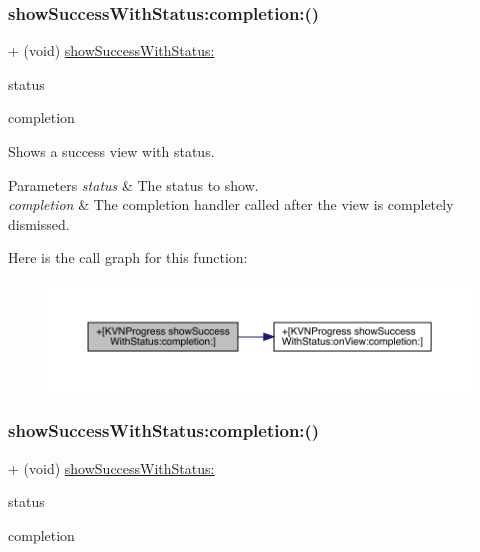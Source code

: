 \subsubsection{\texorpdfstring{show\+Success\+With\+Status\+:completion\+:()}{showSuccessWithStatus:completion:()}\hspace{0.1cm}{\footnotesize\ttfamily [2/3]}}
{\footnotesize\ttfamily + (void) \mbox{\hyperlink{interface_k_v_n_progress_ae9b8b57302f6a4456658e758784790bf}{show\+Success\+With\+Status\+:}} \begin{DoxyParamCaption}\item[{(N\+S\+String $\ast$)}]{status }\item[{completion:(K\+V\+N\+Completion\+Block)}]{completion }\end{DoxyParamCaption}}

Shows a success view with {\ttfamily status}. 
\begin{DoxyParams}{Parameters}
{\em status} & The status to show. \\
\hline
{\em completion} & The completion handler called after the view is completely dismissed. \\
\hline
\end{DoxyParams}
Here is the call graph for this function\+:\nopagebreak
\begin{figure}[H]
\begin{center}
\leavevmode
\includegraphics[width=350pt]{interface_k_v_n_progress_aa4d2366ad5664f42a3c9214f97e4d373_cgraph}
\end{center}
\end{figure}
\mbox{\label{interface_k_v_n_progress_aa4d2366ad5664f42a3c9214f97e4d373}} 
\subsubsection{\texorpdfstring{show\+Success\+With\+Status\+:completion\+:()}{showSuccessWithStatus:completion:()}\hspace{0.1cm}{\footnotesize\ttfamily [3/3]}}
{\footnotesize\ttfamily + (void) \mbox{\hyperlink{interface_k_v_n_progress_ae9b8b57302f6a4456658e758784790bf}{show\+Success\+With\+Status\+:}} \begin{DoxyParamCaption}\item[{(N\+S\+String $\ast$)}]{status }\item[{completion:(K\+V\+N\+Completion\+Block)}]{completion }\end{DoxyParamCaption}}

